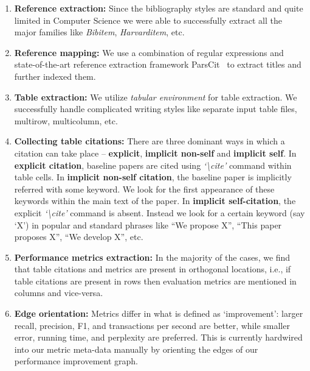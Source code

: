 \documentclass[runningheads]{llncs}
\begin{document}
\iffalse
\begin{enumerate}
\item \textbf{Reference extraction:} Since the bibliography styles are standard and quite limited in Computer Science we were able to successfully extract all the major families like \textit{Bibitem}, \textit{Harvarditem}, etc. 
\item \textbf{Reference mapping:} We use a combination of regular expressions and state-of-the-art reference extraction framework ParsCit~\cite{DBLP:conf/lrec/CouncillGK08} to extract titles and further indexed them. 
\item \textbf{Table extraction:} We utilize \textit{tabular environment} for table extraction. We successfully handle complicated writing styles like separate input table files, multirow, multicolumn, etc. 
\item \textbf{Collecting table citations:} 
There are three dominant ways in which a citation can take place -- \textbf{explicit}, \textbf{implicit non-self} and \textbf{implicit self}. In \textbf{explicit citation}, baseline papers are cited using \textit{`\textbackslash cite'} command within table cells. In \textbf{implicit non-self citation}, the baseline paper is implicitly referred with some keyword. We look for the first appearance of these keywords within the main text of the paper. %
In \textbf{implicit self-citation}, the explicit \textit{`\textbackslash cite'} command is absent. Instead we look for a certain keyword (say `X') in popular and standard phrases like ``We propose X'', ``This paper proposes X'', ``We develop X'', etc.%

\item \textbf{Performance metrics extraction:} In the majority of the cases, we find that table citations and metrics are present in orthogonal locations, i.e., if table citations are present in rows then evaluation metrics are mentioned in columns and vice-versa. 

\item \textbf{Edge orientation:} Metrics differ in what is defined as `improvement': larger recall, precision, F1, and transactions per second are better, while smaller error, running time, and perplexity are preferred.  This is currently hardwired into our metric meta-data manually by orienting the edges of our performance improvement graph.
\end{enumerate}
\end{document}
